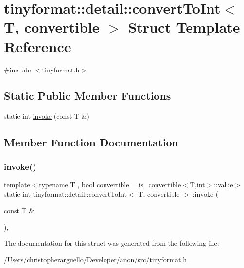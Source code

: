 \hypertarget{structtinyformat_1_1detail_1_1convert_to_int}{}\section{tinyformat\+:\+:detail\+:\+:convert\+To\+Int$<$ T, convertible $>$ Struct Template Reference}
\label{structtinyformat_1_1detail_1_1convert_to_int}


{\ttfamily \#include $<$tinyformat.\+h$>$}

\subsection*{Static Public Member Functions}
\begin{DoxyCompactItemize}
\item 
static int \mbox{\hyperlink{structtinyformat_1_1detail_1_1convert_to_int_a1e1c0d85c6afc3bb21d2bc9458b3feb1}{invoke}} (const T \&)
\end{DoxyCompactItemize}


\subsection{Member Function Documentation}
\mbox{\label{structtinyformat_1_1detail_1_1convert_to_int_a1e1c0d85c6afc3bb21d2bc9458b3feb1}} 
\subsubsection{\texorpdfstring{invoke()}{invoke()}}
{\footnotesize\ttfamily template$<$typename T , bool convertible = is\+\_\+convertible$<$\+T,int$>$\+::value$>$ \\
static int \mbox{\hyperlink{structtinyformat_1_1detail_1_1convert_to_int}{tinyformat\+::detail\+::convert\+To\+Int}}$<$ T, convertible $>$\+::invoke (\begin{DoxyParamCaption}\item[{const T \&}]{ }\end{DoxyParamCaption})\hspace{0.3cm}{\ttfamily [inline]}, {\ttfamily [static]}}



The documentation for this struct was generated from the following file\+:\begin{DoxyCompactItemize}
\item 
/\+Users/christopherarguello/\+Developer/anon/src/\mbox{\hyperlink{tinyformat_8h}{tinyformat.\+h}}\end{DoxyCompactItemize}
